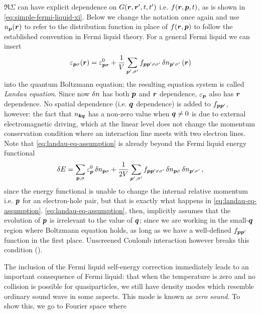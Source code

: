 \documentclass[hyperref, a4paper]{article}
\newcommand*{\term}[1]{\textit{#1}}
\begin{document}
$\Re \Sigma$ can have explicit dependence on $G(\vb*{r}, \vb*{r}', t, t')$
i.e. $f(\vb*{r}, \vb*{p}, t)$,
as is shown in \eqref{eq:simple-fermi-liquid-xi}.
Below we change the notation once again and use $n_{\vb*{p}}(\vb*{r})$ 
to refer to the distribution function in place of $f(\vb*{r}, \vb*{p})$
to follow the established convention in Fermi liquid theory.
For a general Fermi liquid we can insert
\begin{equation}
    \varepsilon_{\vb*{p} \sigma}(\vb*{r}) = \varepsilon^0_{\vb*{p} \sigma} + 
    \frac{1}{V} \sum_{\vb*{p}', \sigma'} f_{\vb*{p} \vb*{p}' \sigma \sigma'} \var{n}_{\vb*{p}' \sigma'} (\vb*{r})
    \label{eq:landau-eq-assumption}
\end{equation}
into the quantum Boltzmann equation;
the resulting equation system is called \term{Landau equation}.
Since now $\var{n}$ has both $\vb*{p}$ and $\vb*{r}$ dependence,
$\varepsilon_{\vb*{p}}$ also has $\vb*{r}$ dependence.
No spatial dependence (i.e. $\vb*{q}$ dependence) 
is added to $f_{\vb*{p} \vb*{p}'}$, however:
the fact that $n_{\vb*{k} \vb*{q}}$ has a non-zero value when $\vb*{q} \neq 0$
is due to external electromagnetic driving, 
which at the linear level does not change
the momentum conservation condition 
where an interaction line meets with two electron lines.
Note that \eqref{eq:landau-eq-assumption} is already beyond 
the Fermi liquid energy functional
\begin{equation}
    \var{E} = \sum_{\vb*{p}, \sigma} \varepsilon^0_{\vb*{p}} \var{n}_{\vb*{p} \sigma}
    + \frac{1}{2V} \sum_{\vb*{p}', \sigma'} f_{\vb*{p} \vb*{p}' \sigma \sigma'}
    \var{n}_{\vb*{p} \sigma} \var{n}_{\vb*{p}' \sigma'},
\end{equation}
since the energy functional is unable to change the internal relative momentum
i.e. $\vb*{p}$ for an electron-hole pair,
but that is exactly what happens in \eqref{eq:landau-eq-assumption}.
\eqref{eq:landau-eq-assumption}, then, implicitly assumes 
that the evolution of $\vb*{p}$ is irrelevant to the value of $\vb*{q}$;
since we are working in the small-$\vb*{q}$ region where Boltzmann equation holds,
as long as we have a well-defined $f_{\vb*{p} \vb*{p}'}$ function 
in the first place.
Unscreened Coulomb interaction however breaks this condition
().

The inclusion of the Fermi liquid self-energy correction 
immediately leads to an important consequence 
of Fermi liquid: 
that when the temperature is zero and 
no collision is possible for quasiparticles, 
we still have density modes which resemble 
ordinary sound wave in some aspects. 
This mode is known as \emph{zero sound}.
To show this, we go to Fourier space where 
\end{document}
